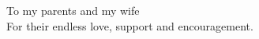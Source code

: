 \begin{dedication}
{\large{To my parents and my wife}}\\[5mm]
For their endless love, support and encouragement.
\end{dedication}

